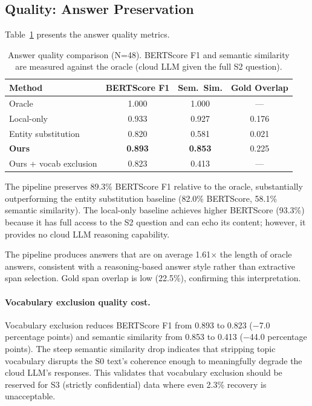 \documentclass[sigconf,anonymous,review,balance=false]{acmart}
\begin{document}
\subsection{Quality: Answer Preservation}
\label{sec:quality-results}

Table~\ref{tab:quality} presents the answer quality metrics.

\begin{table}[t]
\caption{Answer quality comparison (N=48). BERTScore F1 and semantic similarity are measured against the oracle (cloud LLM given the full S2 question).}
\label{tab:quality}
\begin{tabular}{lccc}
\toprule
\textbf{Method} & \textbf{BERTScore F1} & \textbf{Sem.\ Sim.} & \textbf{Gold Overlap} \\
\midrule
Oracle & 1.000 & 1.000 & --- \\
Local-only & 0.933 & 0.927 & 0.176 \\
Entity substitution & 0.820 & 0.581 & 0.021 \\
\textbf{Ours} & \textbf{0.893} & \textbf{0.853} & 0.225 \\
Ours + vocab exclusion & 0.823 & 0.413 & --- \\
\bottomrule
\end{tabular}
\end{table}

The pipeline preserves 89.3\% BERTScore F1 relative to the oracle, substantially outperforming the entity substitution baseline (82.0\% BERTScore, 58.1\% semantic similarity). The local-only baseline achieves higher BERTScore (93.3\%) because it has full access to the S2 question and can echo its content; however, it provides no cloud LLM reasoning capability.

The pipeline produces answers that are on average 1.61$\times$ the length of oracle answers, consistent with a reasoning-based answer style rather than extractive span selection. Gold span overlap is low (22.5\%), confirming this interpretation.

\paragraph{Vocabulary exclusion quality cost.} Vocabulary exclusion reduces BERTScore F1 from 0.893 to 0.823 ($-$7.0 percentage points) and semantic similarity from 0.853 to 0.413 ($-$44.0 percentage points). The steep semantic similarity drop indicates that stripping topic vocabulary disrupts the S0 text's coherence enough to meaningfully degrade the cloud LLM's responses. This validates that vocabulary exclusion should be reserved for S3 (strictly confidential) data where even 2.3\% recovery is unacceptable.
\end{document}
